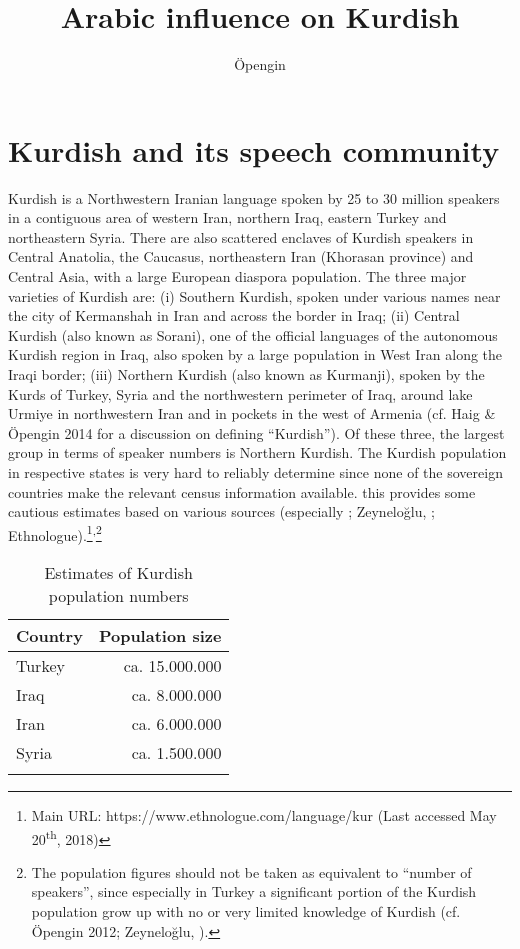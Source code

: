 \documentclass[output=paper]{langsci/langscibook}
\author{Öpengin\affiliation{University}}
\title{Arabic influence on Kurdish}
\begin{document}
\maketitle

\section{Kurdish and its speech community} 

Kurdish is a Northwestern Iranian language spoken by 25 to 30 million speakers in a contiguous area of western Iran, northern Iraq, eastern Turkey and northeastern Syria. There are also scattered enclaves of Kurdish speakers in Central Anatolia, the Caucasus, northeastern Iran (Khorasan province) and Central Asia, with a large European diaspora population. The three major varieties of Kurdish are: (i) Southern Kurdish, spoken under various names near the city of Kermanshah in Iran and across the border in Iraq; (ii) Central Kurdish (also known as Sorani), one of the official languages of the autonomous Kurdish region in Iraq, also spoken by a large population in West Iran along the Iraqi border; (iii) Northern Kurdish (also known as Kurmanji), spoken by the Kurds of Turkey, Syria and the northwestern perimeter of Iraq, around lake Urmiye in northwestern Iran and in pockets in the west of Armenia (cf. Haig \& Öpengin 2014 for a discussion on defining “Kurdish”). Of these three, the largest group in terms of speaker numbers is Northern Kurdish. The Kurdish population in respective states is very hard to reliably determine since none of the sovereign countries make the relevant census information available.  this provides some cautious estimates based on various sources (especially \citealt{Sirkeci2005}; Zeyneloğlu, \citealt{SirkeciCivelek2016}; Ethnologue).\footnote{Main URL: https://www.ethnologue.com/language/kur (Last accessed May 20\textsuperscript{th}, 2018)}\textsuperscript{,}\footnote{The population figures should not be taken as equivalent to “number of speakers”, since especially in Turkey a significant portion of the Kurdish population grow up with no or very limited knowledge of Kurdish (cf. Öpengin 2012; Zeyneloğlu, \citealt{SirkeciCivelek2016}).} 

\begin{table}
\begin{tabular}{lr}
\lsptoprule
Country & Population size\\\midrule
{Turkey} & ca. 15.000.000\\
{Iraq}   & ca. 8.000.000\\
{Iran}   & ca. 6.000.000\\
{Syria}  & ca. 1.500.000\\
\lspbottomrule
\end{tabular}
\caption{Estimates of Kurdish population numbers}
\end{table}
\end{document}

